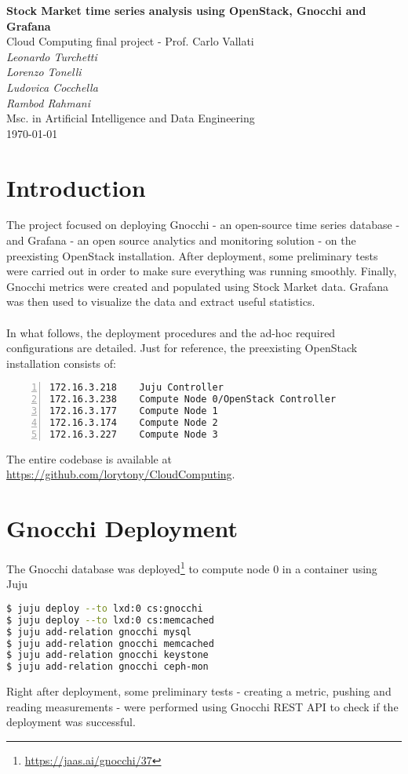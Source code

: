 \documentclass[11pt,a4paper]{article}
\begin{document}
\begin{center}
	\Large\textbf{Stock Market time series analysis using OpenStack, Gnocchi and Grafana}\\
	\vspace{0.2cm}
	\large{Cloud Computing final project - Prof. Carlo Vallati}\\
	\vspace{1.0cm}
	\large\textit{Leonardo Turchetti}\\
	\large\textit{Lorenzo Tonelli}\\
	\large\textit{Ludovica Cocchella}\\
	\large\textit{Rambod Rahmani}\\
	\vspace{0.2cm}
	\normalsize{Msc. in Artificial Intelligence and Data Engineering}\\
	\vspace{1.0cm}
	\today
\end{center}
\tableofcontents
\section{Introduction}
The project focused on deploying Gnocchi - an open-source time series database - and Grafana - an open source analytics and monitoring solution - on the preexisting OpenStack installation. After deployment, some preliminary tests were carried out in order to make sure everything was running smoothly. Finally, Gnocchi metrics were created and populated using Stock Market data. Grafana was then used to visualize the data and extract useful statistics.\\
\\
In what follows, the deployment procedures and the ad-hoc required configurations are detailed. Just for reference, the preexisting OpenStack installation consists of:
\begin{lstlisting}[language=bash,numbers=left]
172.16.3.218    Juju Controller
172.16.3.238    Compute Node 0/OpenStack Controller
172.16.3.177    Compute Node 1
172.16.3.174    Compute Node 2
172.16.3.227    Compute Node 3
\end{lstlisting}
The entire codebase is available at \url{https://github.com/lorytony/CloudComputing}.
\section{Gnocchi Deployment}
The Gnocchi database was deployed\footnote{\url{https://jaas.ai/gnocchi/37}} to compute node 0 in a container using Juju
\begin{lstlisting}[language=bash]
$ juju deploy --to lxd:0 cs:gnocchi
$ juju deploy --to lxd:0 cs:memcached
$ juju add-relation gnocchi mysql
$ juju add-relation gnocchi memcached
$ juju add-relation gnocchi keystone
$ juju add-relation gnocchi ceph-mon
\end{lstlisting}
Right after deployment, some preliminary tests - creating a metric, pushing and reading measurements - were performed using Gnocchi REST API to check if the deployment was successful.
\end{document}
